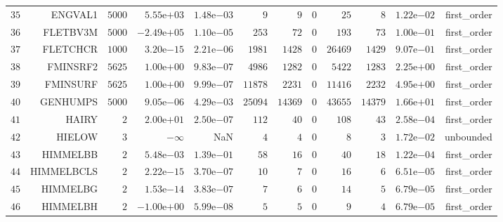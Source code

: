 \begin{longtable}{rrrrrrrrrrrr}
  \(    35\) & ENGVAL1 & \(  5000\) & \( 5.55\)e\(+03\) & \( 1.48\)e\(-03\) & \(     9\) & \(     9\) & \(     0\) & \(    25\) & \(     8\) & \( 1.22\)e\(-02\) & first\_order \\
  \(    36\) & FLETBV3M & \(  5000\) & \(-2.49\)e\(+05\) & \( 1.10\)e\(-05\) & \(   253\) & \(    72\) & \(     0\) & \(   193\) & \(    73\) & \( 1.00\)e\(-01\) & first\_order \\
  \(    37\) & FLETCHCR & \(  1000\) & \( 3.20\)e\(-15\) & \( 2.21\)e\(-06\) & \(  1981\) & \(  1428\) & \(     0\) & \( 26469\) & \(  1429\) & \( 9.07\)e\(-01\) & first\_order \\
  \(    38\) & FMINSRF2 & \(  5625\) & \( 1.00\)e\(+00\) & \( 9.83\)e\(-07\) & \(  4986\) & \(  1282\) & \(     0\) & \(  5422\) & \(  1283\) & \( 2.25\)e\(+00\) & first\_order \\
  \(    39\) & FMINSURF & \(  5625\) & \( 1.00\)e\(+00\) & \( 9.99\)e\(-07\) & \( 11878\) & \(  2231\) & \(     0\) & \( 11416\) & \(  2232\) & \( 4.95\)e\(+00\) & first\_order \\
  \(    40\) & GENHUMPS & \(  5000\) & \( 9.05\)e\(-06\) & \( 4.29\)e\(-03\) & \( 25094\) & \( 14369\) & \(     0\) & \( 43655\) & \( 14379\) & \( 1.66\)e\(+01\) & first\_order \\
  \(    41\) & HAIRY & \(     2\) & \( 2.00\)e\(+01\) & \( 2.50\)e\(-07\) & \(   112\) & \(    40\) & \(     0\) & \(   108\) & \(    43\) & \( 2.58\)e\(-04\) & first\_order \\
  \(    42\) & HIELOW & \(     3\) & \(-\infty\) &       NaN & \(     4\) & \(     4\) & \(     0\) & \(     8\) & \(     3\) & \( 1.72\)e\(-02\) & unbounded \\
  \(    43\) & HIMMELBB & \(     2\) & \( 5.48\)e\(-03\) & \( 1.39\)e\(-01\) & \(    58\) & \(    16\) & \(     0\) & \(    40\) & \(    18\) & \( 1.22\)e\(-04\) & first\_order \\
  \(    44\) & HIMMELBCLS & \(     2\) & \( 2.22\)e\(-15\) & \( 3.70\)e\(-07\) & \(    10\) & \(     7\) & \(     0\) & \(    16\) & \(     6\) & \( 6.51\)e\(-05\) & first\_order \\
  \(    45\) & HIMMELBG & \(     2\) & \( 1.53\)e\(-14\) & \( 3.83\)e\(-07\) & \(     7\) & \(     6\) & \(     0\) & \(    14\) & \(     5\) & \( 6.79\)e\(-05\) & first\_order \\
  \(    46\) & HIMMELBH & \(     2\) & \(-1.00\)e\(+00\) & \( 5.99\)e\(-08\) & \(     5\) & \(     5\) & \(     0\) & \(     9\) & \(     4\) & \( 6.79\)e\(-05\) & first\_order \\

\end{longtable}
